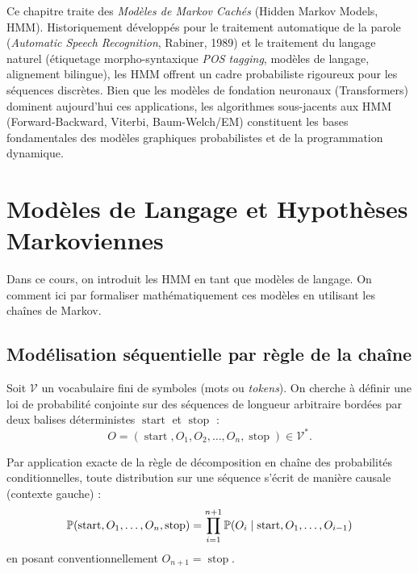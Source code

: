 

\minitoc

Ce chapitre traite des \emph{Modèles de Markov Cachés} (Hidden Markov Models, HMM). 
Historiquement développés pour le traitement automatique de la parole (\emph{Automatic Speech Recognition}, Rabiner, 1989) et le traitement du langage naturel (étiquetage morpho-syntaxique \emph{POS tagging}, modèles de langage, alignement bilingue), les HMM offrent un cadre probabiliste rigoureux pour les séquences discrètes. Bien que les modèles de fondation neuronaux (Transformers) dominent aujourd'hui ces applications, les algorithmes sous-jacents aux HMM (Forward-Backward, Viterbi, Baum-Welch/EM) constituent les bases fondamentales des modèles graphiques probabilistes et de la programmation dynamique.

\section{Modèles de Langage et Hypothèses Markoviennes}

Dans ce cours, on introduit les HMM en tant que modèles de langage. On comment ici par formaliser mathématiquement ces modèles en utilisant les chaînes de Markov. 

\subsection{Modélisation séquentielle par règle de la chaîne}

Soit $\mathcal{V}$ un vocabulaire fini de symboles (mots ou \emph{tokens}). On cherche à définir une loi de probabilité conjointe sur des séquences de longueur arbitraire bordées par deux balises déterministes $\operatorname{start}$ et $\operatorname{stop}$ :
\begin{equation}
    O = (\operatorname{start}, O_1, O_2, \dots, O_n, \operatorname{stop}) \in \mathcal{V}^*.
\end{equation}

Par application exacte de la règle de décomposition en chaîne des probabilités conditionnelles, toute distribution sur une séquence s'écrit de manière causale (contexte gauche) :
\begin{equation}
    \mathbb{P}(\operatorname{start}, O_1, \dots, O_n, \operatorname{stop}) = \prod_{i=1}^{n+1} \mathbb{P}(O_i \mid \operatorname{start}, O_1, \dots, O_{i-1})
\end{equation}
en posant conventionnellement $O_{n+1} = \operatorname{stop}$.

